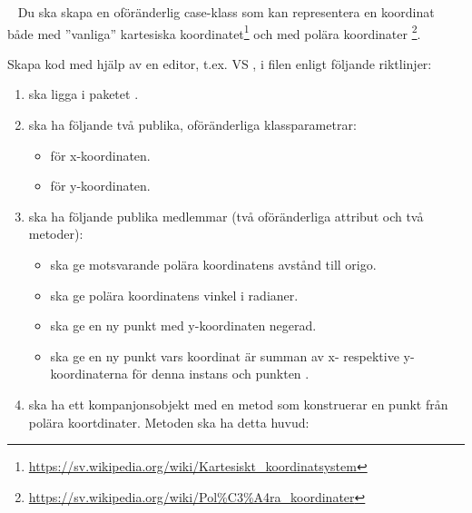 \QUESTBEGIN

\Task \what~
Du ska skapa en oföränderlig case-klass  som kan representera en koordinat både med ''vanliga'' kartesiska koordinatet\footnote{\url{https://sv.wikipedia.org/wiki/Kartesiskt_koordinatsystem}} och med polära koordinater%
\footnote{\url{https://sv.wikipedia.org/wiki/Pol\%C3\%A4ra\_koordinater}}.

\Subtask Skapa kod med hjälp av en editor, t.ex. VS , i filen   enligt följande riktlinjer:
\begin{enumerate}[noitemsep]
\item {} ska ligga i paketet .

\item {} ska ha följande två publika, oföränderliga klassparametrar:
\begin{itemize}[nolistsep, noitemsep]
\item {} för x-koordinaten.
\item {} för y-koordinaten.
\end{itemize}

\item {} ska ha följande publika medlemmar (två oföränderliga attribut och två metoder):
\begin{itemize}[nolistsep, noitemsep]
\item {} ska ge motsvarande polära koordinatens
 avstånd till origo.
\item {} ska ge polära koordinatens vinkel i radianer.
\item {} ska ge en ny punkt med y-koordinaten negerad.
\item {} ska ge en ny punkt vars koordinat är summan av x- respektive y-koordinaterna för denna instans och punkten .
\end{itemize}

\item {} ska ha ett kompanjonsobjekt med en metod som konstruerar en punkt från polära koortdinater. Metoden ska ha detta huvud: \\

\end{enumerate}

